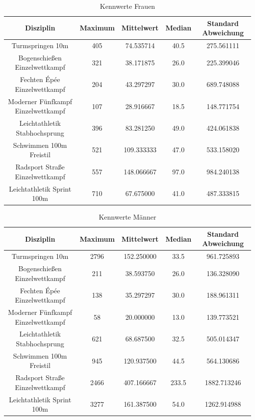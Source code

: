 \documentclass[11pt]{article}
\begin{document}
\begin{table}
\begin{tabular}{ c|c|c|c|c }
  Disziplin & Maximum & Mittelwert & Median & Standard Abweichung \\
  \hline
  Turmspringen 10m & 405 & 74.535714 & 40.5 & 275.561111 \\
  Bogenschießen Einzelwettkampf & 321 & 38.171875 & 26.0 & 225.399046 \\
  Fechten Épée Einzelwettkampf & 204 & 43.297297 & 30.0 & 689.748088 \\
  Moderner Fünfkampf Einzelwettkampf & 107 & 28.916667 & 18.5 & 148.771754 \\
  Leichtathletik Stabhochsprung & 396 & 83.281250 & 49.0 & 424.061838\\
  Schwimmen 100m Freistil & 521 & 109.333333 & 47.0 & 533.158020\\
  Radsport Straße Einzelwettkampf & 557 & 148.066667 & 97.0 & 984.240138\\
  Leichtathletik Sprint 100m & 710 & 67.675000 & 41.0 & 487.333815\\
\end{tabular}
\caption{\label{tab:table-name}Kennwerte Frauen}
\end{table}

\begin{table}
\begin{tabular}{ c|c|c|c|c }
  Disziplin & Maximum & Mittelwert & Median & Standard Abweichung \\
  \hline
  Turmspringen 10m & 2796 & 152.250000 & 33.5 & 961.725893 \\
  Bogenschießen Einzelwettkampf & 211 & 38.593750 & 26.0 & 136.328090\\
  Fechten Épée Einzelwettkampf & 138 & 35.297297 & 30.0 & 188.961311 \\
  Moderner Fünfkampf Einzelwettkampf & 58 & 20.000000 & 13.0 & 139.773521\\
  Leichtathletik Stabhochsprung & 621 & 68.687500 & 32.5 & 505.014347\\
  Schwimmen 100m Freistil & 945 & 120.937500 & 44.5 & 564.130686\\
  Radsport Straße Einzelwettkampf & 2466 & 407.166667 & 233.5 & 1882.713246\\
  Leichtathletik Sprint 100m & 3277 & 161.387500 & 54.0 & 1262.914988\\
\end{tabular}
\caption{\label{tab:table-name}Kennwerte Männer}
\end{table}
\end{document}
